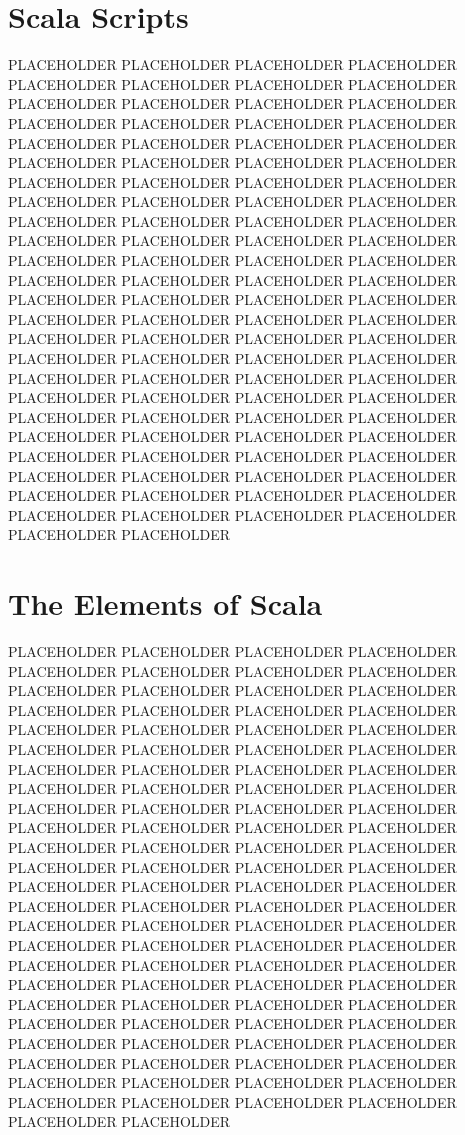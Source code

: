 \section{Scala Scripts}

PLACEHOLDER PLACEHOLDER PLACEHOLDER PLACEHOLDER PLACEHOLDER PLACEHOLDER PLACEHOLDER PLACEHOLDER PLACEHOLDER PLACEHOLDER PLACEHOLDER PLACEHOLDER PLACEHOLDER PLACEHOLDER PLACEHOLDER PLACEHOLDER PLACEHOLDER PLACEHOLDER PLACEHOLDER PLACEHOLDER PLACEHOLDER PLACEHOLDER PLACEHOLDER PLACEHOLDER PLACEHOLDER PLACEHOLDER PLACEHOLDER PLACEHOLDER PLACEHOLDER PLACEHOLDER PLACEHOLDER PLACEHOLDER PLACEHOLDER PLACEHOLDER PLACEHOLDER PLACEHOLDER PLACEHOLDER PLACEHOLDER PLACEHOLDER PLACEHOLDER PLACEHOLDER PLACEHOLDER PLACEHOLDER PLACEHOLDER PLACEHOLDER PLACEHOLDER PLACEHOLDER PLACEHOLDER PLACEHOLDER PLACEHOLDER PLACEHOLDER PLACEHOLDER PLACEHOLDER PLACEHOLDER PLACEHOLDER PLACEHOLDER PLACEHOLDER PLACEHOLDER PLACEHOLDER PLACEHOLDER PLACEHOLDER PLACEHOLDER PLACEHOLDER PLACEHOLDER PLACEHOLDER PLACEHOLDER PLACEHOLDER PLACEHOLDER PLACEHOLDER PLACEHOLDER PLACEHOLDER PLACEHOLDER PLACEHOLDER PLACEHOLDER PLACEHOLDER PLACEHOLDER PLACEHOLDER PLACEHOLDER PLACEHOLDER PLACEHOLDER PLACEHOLDER PLACEHOLDER PLACEHOLDER PLACEHOLDER PLACEHOLDER PLACEHOLDER PLACEHOLDER PLACEHOLDER PLACEHOLDER PLACEHOLDER PLACEHOLDER PLACEHOLDER PLACEHOLDER PLACEHOLDER PLACEHOLDER PLACEHOLDER PLACEHOLDER PLACEHOLDER

\section{The Elements of Scala}

PLACEHOLDER PLACEHOLDER PLACEHOLDER PLACEHOLDER PLACEHOLDER PLACEHOLDER PLACEHOLDER PLACEHOLDER PLACEHOLDER PLACEHOLDER PLACEHOLDER PLACEHOLDER PLACEHOLDER PLACEHOLDER PLACEHOLDER PLACEHOLDER PLACEHOLDER PLACEHOLDER PLACEHOLDER PLACEHOLDER PLACEHOLDER PLACEHOLDER PLACEHOLDER PLACEHOLDER PLACEHOLDER PLACEHOLDER PLACEHOLDER PLACEHOLDER PLACEHOLDER PLACEHOLDER PLACEHOLDER PLACEHOLDER PLACEHOLDER PLACEHOLDER PLACEHOLDER PLACEHOLDER PLACEHOLDER PLACEHOLDER PLACEHOLDER PLACEHOLDER PLACEHOLDER PLACEHOLDER PLACEHOLDER PLACEHOLDER PLACEHOLDER PLACEHOLDER PLACEHOLDER PLACEHOLDER PLACEHOLDER PLACEHOLDER PLACEHOLDER PLACEHOLDER PLACEHOLDER PLACEHOLDER PLACEHOLDER PLACEHOLDER PLACEHOLDER PLACEHOLDER PLACEHOLDER PLACEHOLDER PLACEHOLDER PLACEHOLDER PLACEHOLDER PLACEHOLDER PLACEHOLDER PLACEHOLDER PLACEHOLDER PLACEHOLDER PLACEHOLDER PLACEHOLDER PLACEHOLDER PLACEHOLDER PLACEHOLDER PLACEHOLDER PLACEHOLDER PLACEHOLDER PLACEHOLDER PLACEHOLDER PLACEHOLDER PLACEHOLDER PLACEHOLDER PLACEHOLDER PLACEHOLDER PLACEHOLDER PLACEHOLDER PLACEHOLDER PLACEHOLDER PLACEHOLDER PLACEHOLDER PLACEHOLDER PLACEHOLDER PLACEHOLDER PLACEHOLDER PLACEHOLDER PLACEHOLDER PLACEHOLDER PLACEHOLDER PLACEHOLDER

